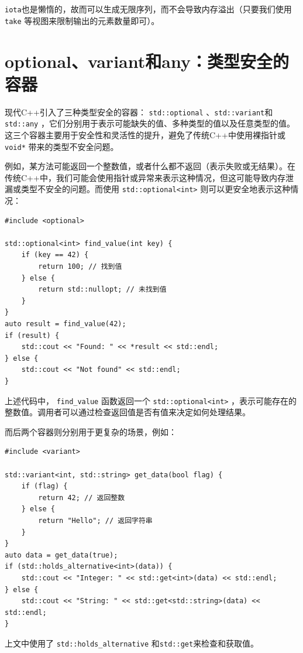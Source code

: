 \verb|iota|也是懒惰的，故而可以生成无限序列，而不会导致内存溢出（只要我们使用 \verb|take| 等视图来限制输出的元素数量即可）。

\section{optional、variant和any：类型安全的容器}

现代C++引入了三种类型安全的容器： \verb|std::optional| 、\verb|std::variant|和 \verb|std::any| ，它们分别用于表示可能缺失的值、多种类型的值以及任意类型的值。这三个容器主要用于安全性和灵活性的提升，避免了传统C++中使用裸指针或 \verb|void*| 带来的类型不安全问题。

例如，某方法可能返回一个整数值，或者什么都不返回（表示失败或无结果）。在传统C++中，我们可能会使用指针或异常来表示这种情况，但这可能导致内存泄漏或类型不安全的问题。而使用 \verb|std::optional<int>| 则可以更安全地表示这种情况：

\begin{verbatim}
#include <optional>

std::optional<int> find_value(int key) {
    if (key == 42) {
        return 100; // 找到值
    } else {
        return std::nullopt; // 未找到值
    }
}
auto result = find_value(42);
if (result) {
    std::cout << "Found: " << *result << std::endl;
} else {
    std::cout << "Not found" << std::endl;
}
\end{verbatim}
上述代码中， \verb|find_value| 函数返回一个 \verb|std::optional<int>| ，表示可能存在的整数值。调用者可以通过检查返回值是否有值来决定如何处理结果。

而后两个容器则分别用于更复杂的场景，例如：
\begin{verbatim}
#include <variant>

std::variant<int, std::string> get_data(bool flag) {
    if (flag) {
        return 42; // 返回整数
    } else {
        return "Hello"; // 返回字符串
    }
}
auto data = get_data(true);
if (std::holds_alternative<int>(data)) {
    std::cout << "Integer: " << std::get<int>(data) << std::endl;
} else {
    std::cout << "String: " << std::get<std::string>(data) << std::endl;
}
\end{verbatim}
上文中使用了 \verb|std::holds_alternative| 和\verb|std::get|来检查和获取值。

